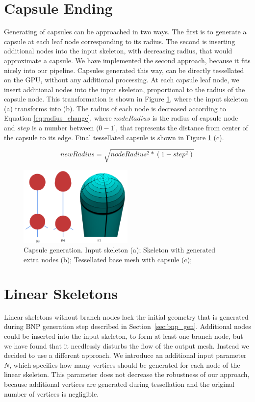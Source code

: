 \section{Capsule Ending}
Generating of capsules can be approached in two ways.
The first is to generate a capsule at each leaf node corresponding to its radius.
The second is inserting additional nodes into the input skeleton, with decreasing radius, that would approximate a capsule.
We have implemented the second approach, because it fits nicely into our pipeline.
Capsules generated this way, can be directly tessellated on the GPU, without any additional processing.
At each capsule leaf node, we insert additional nodes into the input skeleton, proportional to the radius of the capsule node.
This transformation is shown in Figure \ref{fig:capsule_ilu}, where the input skeleton (a) transforms into (b).
The radius of each node is decreased according to Equation \ref{eq:radius_change}, where $nodeRadius$ is the radius of capsule node and $step$ is a number between $(0-1]$, that represents the distance from center of the capsule to its edge.
Final tessellated capsule is shown in Figure \ref{fig:capsule_ilu} (c).

\begin{equation}
newRadius = \sqrt{nodeRadius^{2} * (1 - step^{2})}
\label{eq:radius_change}
\end{equation}

\begin{figure}[ht]
    \centering
    \includegraphics[width=0.5\textwidth]{images/capsule_process}
    \caption[Capsule generation]{Capsule generation. Input skeleton (a); Skeleton with generated extra nodes (b); Tessellated base mesh with capsule (c);}
    \label{fig:capsule_ilu}
\end{figure}

\section{Linear Skeletons}
Linear skeletons without branch nodes lack the initial geometry that is generated during BNP generation step described in Section~\ref{sec:bnp_gen}.
Additional nodes could be inserted into the input skeleton, to form at least one branch node, but we have found that it needlessly disturbs the flow of the output mesh.
Instead we decided to use a different approach.
We introduce an additional input parameter $N$, which specifies how many vertices should be generated for each node of the linear skeleton.
This parameter does not decrease the robustness of our approach, because additional vertices are generated during tessellation and the original number of vertices is negligible.

